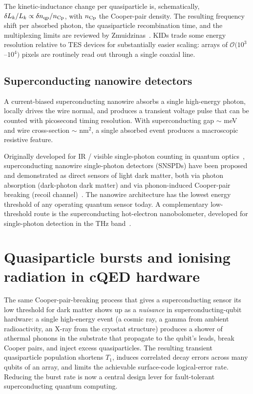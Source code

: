 The kinetic-inductance change per quasiparticle is, schematically,
$\delta L_k/L_k\propto \delta n_{\rm qp}/n_{\rm Cp}$, with
$n_{\rm Cp}$ the Cooper-pair density. The resulting frequency
shift per absorbed photon, the quasiparticle recombination time,
and the multiplexing limits are reviewed by
Zmuidzinas~\cite{zmuidzinas2012}. KIDs trade some energy
resolution relative to TES devices for substantially easier
scaling: arrays of $\mathcal O(10^3$--$10^4)$ pixels are routinely
read out through a single coaxial line.

\subsection{Superconducting nanowire detectors}
\label{sec:snspd}

\begin{phenomenon}
A current-biased superconducting nanowire absorbs a single
high-energy photon, locally drives the wire normal, and produces
a transient voltage pulse that can be counted with picosecond
timing resolution. With superconducting gap $\sim$ meV and wire
cross-section $\sim$ nm$^2$, a single absorbed event produces a
macroscopic resistive feature.
\end{phenomenon}

Originally developed for IR / visible single-photon counting in
quantum optics~\cite{natarajan2012}, superconducting nanowire
single-photon detectors (SNSPDs) have been proposed and
demonstrated as direct sensors of light dark matter, both via
photon absorption (dark-photon dark matter) and via phonon-induced
Cooper-pair breaking (recoil channel)~\cite{hochberg2021}. The
nanowire architecture has the lowest energy threshold of any
operating quantum sensor today. A complementary low-threshold route
is the superconducting hot-electron nanobolometer, developed for
single-photon detection in the THz band~\cite{karasik2014}.

\section{Quasiparticle bursts and ionising radiation in cQED hardware}
\label{sec:qp-cqed}

\begin{phenomenon}
The same Cooper-pair-breaking process that gives a superconducting
sensor its low threshold for dark matter shows up as a
\emph{nuisance} in superconducting-qubit hardware: a single
high-energy event (a cosmic ray, a gamma from ambient
radioactivity, an X-ray from the cryostat structure) produces a
shower of athermal phonons in the substrate that propagate to the
qubit's leads, break Cooper pairs, and inject excess
quasiparticles. The resulting transient quasiparticle population
shortens $T_1$, induces correlated decay errors across many qubits
of an array, and limits the achievable surface-code logical-error
rate.  Reducing the burst rate is now a central design lever for
fault-tolerant superconducting quantum computing.
\end{phenomenon}


